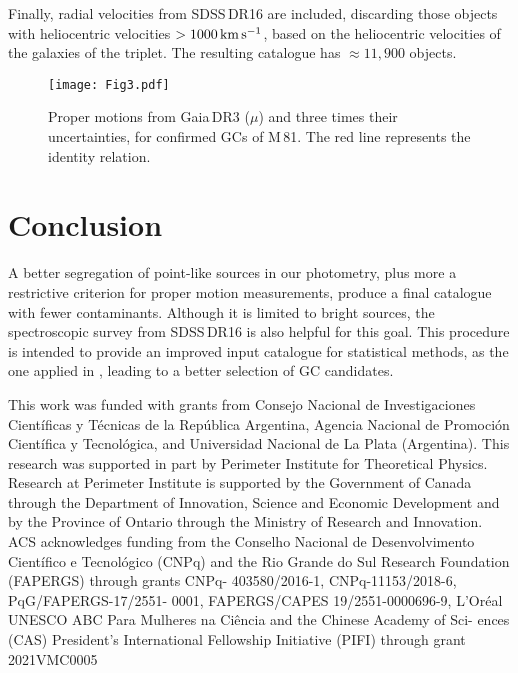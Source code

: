\documentclass[baaa]{baaa}
\begin{document}
Finally, radial velocities from SDSS\,DR16 \citep{ahu20} are included,
discarding those objects with heliocentric velocities $>1000\,{\rm km\,s^{-1}}$, 
based on the heliocentric velocities of the galaxies of the triplet.
The resulting catalogue has $\approx 11,900$ objects.


  \begin{figure}[!t]
  \centering
  \texttt{[image: Fig3.pdf]}
  \caption{Proper motions from Gaia\,DR3 ($\mu$) and three times their
  uncertainties, for confirmed GCs of M\,81. The red line represents the
  identity relation.}
  \label{Fig3}
\end{figure}

\section{Conclusion}
 A better segregation of point-like sources in our photometry, plus more a restrictive
 criterion for proper motion measurements, produce a final catalogue with fewer 
 contaminants. Although it is limited to bright sources, the spectroscopic survey 
 from SDSS\,DR16 is also helpful for this goal. This procedure is intended to provide
 an improved input catalogue for statistical methods, as the one applied in \citet{chi22},
 leading to a better selection of GC candidates. 


\begin{acknowledgement}
This work was funded with grants from Consejo
Nacional de Investigaciones Científicas y Técnicas de la República
Argentina, Agencia Nacional de Promoción Científica y Tecnológica,
and Universidad Nacional de La Plata (Argentina). This research 
was supported
in part by Perimeter Institute for Theoretical Physics. Research
at Perimeter Institute is supported by the Government of Canada
through the Department of Innovation, Science and Economic 
Development and by the Province of Ontario through the Ministry of
Research and Innovation. ACS acknowledges funding from the Conselho Nacional de Desenvolvimento Científico e Tecnológico (CNPq) and the Rio Grande
do Sul Research Foundation (FAPERGS) through grants CNPq-
403580/2016-1, CNPq-11153/2018-6, PqG/FAPERGS-17/2551-
0001, FAPERGS/CAPES 19/2551-0000696-9, L’Oréal UNESCO
ABC Para Mulheres na Ciência and the Chinese Academy of Sci-
ences (CAS) President’s International Fellowship Initiative (PIFI)
through grant 2021VMC0005
\end{acknowledgement}
\end{document}
